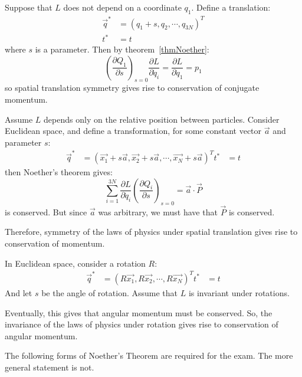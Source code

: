 \documentclass[../Main.tex]{subfiles}
\begin{document}
\begin{example}
    Suppose that $L$ does not depend on a coordinate $q_1$. Define a translation:
    \begin{align*}
        \vec{q}^* &= (q_1 + s, q_2, \cdots, q_{3N})^T \\
        t^* &= t
    \end{align*}
    where $s$ is a parameter. Then by theorem~\ref{thmNoether}:
    \begin{equation*}
        \left(\frac{\partial Q_1}{\partial s}\right)_{s = 0} \frac{\partial L}{\partial \dot{q}_i} = \frac{\partial L}{\partial \dot{q}_1} = p_1
    \end{equation*}
    so spatial translation symmetry gives rise to conservation of conjugate momentum.
\end{example}
\begin{example}
    Assume $L$ depends only on the relative position between particles. Consider Euclidean space, and define a transformation, for some constant vector $\vec{a}$ and parameter $s$:
    \begin{align*}
        \vec{q}^* &= (\vec{x_1} + s\vec{a}, \vec{x_2} + s\vec{a}, \cdots, \vec{x_N} + s\vec{a})^T
        t^* &= t
    \end{align*}
    then Noether's theorem gives:
    \begin{equation*}
        \sum_{i=1}^{3N} \frac{\partial L}{\partial \dot{q}_i} \left(\frac{\partial Q_i}{\partial s}\right)_{s = 0} = \vec{a} \cdot \vec{P}
    \end{equation*}
    is conserved. But since $\vec{a}$ was arbitrary, we must have that $\vec{P}$ is conserved.

    Therefore, symmetry of the laws of physics under spatial translation gives rise to conservation of momentum.
\end{example}
\begin{example}
    In Euclidean space, consider a rotation $R$:
    \begin{align*}
        \vec{q}^* &= (R\vec{x_1}, R\vec{x_2}, \cdots, R\vec{x_N})^T
        t^* &= t
    \end{align*}
    And let $s$ be the angle of rotation. Assume that $L$ is invariant under rotations.

    Eventually, this gives that angular momentum must be conserved. So, the invariance of the laws of physics under rotation gives rise to conservation of angular momentum.
\end{example}
\begin{remark}
    The following forms of Noether's Theorem are required for the exam. The more general statement is not.
\end{remark}
\begin{theorem}
\end{theorem}
\begin{theorem}
    
\end{theorem}
\end{document}
